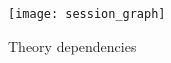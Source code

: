 %
%
%  
%
%

\begin{figure}[p]
  \begin{center}
    \texttt{[image: session\_graph]}
    \caption{Theory dependencies}
  \end{center}
\end{figure}
